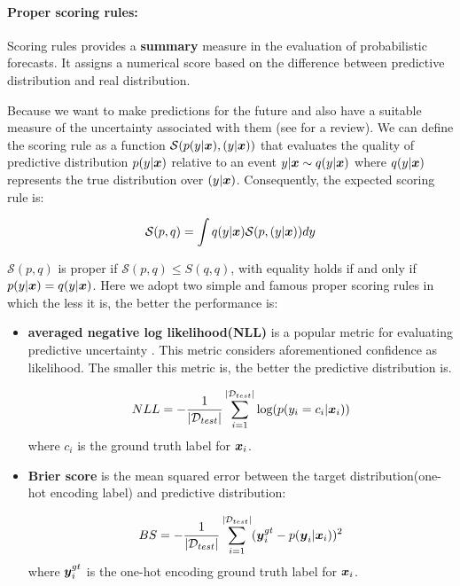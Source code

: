 \paragraph{Proper scoring rules:} 
Scoring rules provides a \textbf{summary} measure in the evaluation of probabilistic forecasts. It assigns a numerical score based on the difference between predictive distribution and real distribution. 

Because we want to make predictions for the future and also have a suitable measure of the uncertainty associated with them (see \cite{gneiting2007strictly} for a review). We can define the scoring rule as a function $\mathcal S(p(y|\boldsymbol x), (y|\boldsymbol x))$ that evaluates the quality of predictive distribution $p(y|\boldsymbol x)$ relative to an event $y|\boldsymbol x \sim q(y|\boldsymbol x)$ where $q(y|\boldsymbol x)$ represents the true distribution over $(y|\boldsymbol x)$. Consequently, the expected scoring rule is:

\begin{equation}\label{scoring rule}
	\mathcal S(p, q) = \int q(y| \boldsymbol x) \mathcal S(p,(y|\boldsymbol x))dy
\end{equation}

$\mathcal S(p,q)$ is proper if $\mathcal S(p,q) \leq S(q,q)$, with equality holds if and only if $p(y|\boldsymbol x) = q(y|\boldsymbol x)$. Here we adopt two simple and famous proper scoring rules in which the less it is, the better the performance is:
\begin{itemize}
	\item \textbf{averaged negative log likelihood(NLL)} is a popular metric for evaluating predictive uncertainty	\cite{quinonero2005evaluating}. This metric considers aforementioned confidence as likelihood. The smaller this metric is, the better the predictive distribution is.
	
	\begin{equation} \label{nll}
		NLL = -\frac{1}{|\mathcal D_{test}|}\sum_{i=1}^{|\mathcal D_{test}|}\text{log}(p(y_i = c_i|\boldsymbol x_i))
	\end{equation}
	where $c_i$ is the ground truth label for $\boldsymbol x_i$.	
	\item \textbf{Brier score} is the mean squared error between the target distribution(one-hot encoding label) and predictive distribution:
	
	\begin{equation} \label{bs}
	BS = -\frac{1}{|\mathcal D_{test}|}\sum_{i=1}^{|\mathcal D_{test}|}(\boldsymbol y^{gt}_i - p(\boldsymbol y_i|\boldsymbol x_i))^2
	\end{equation}
	where $\boldsymbol y^{gt}_i$ is the one-hot encoding ground truth label for $\boldsymbol x_i$. 
	
\end{itemize}

